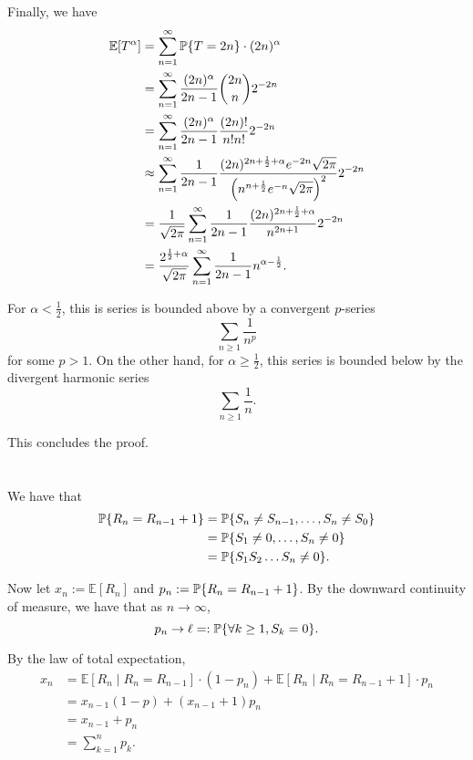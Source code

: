 \documentclass[10pt]{article}
\DeclarePairedDelimiter{\set}{\lbrace}{\rbrace}
\newcommand{\eq}[1]{\stackrel{#1}{=}}
\newcommand{\E}{\mathbb{E}}
\renewcommand{\P}{\mathbb{P}}
\begin{document}
Finally,
we have
\begin{align*}
  \E[T^\alpha]
  &= \sum_{n=1}^\infty \P\set{T=2n}\cdot (2n)^\alpha \\
  &= \sum_{n=1}^\infty \frac{(2n)^\alpha}{2n-1} \binom{2n}{n} 2^{-2n} \\
  &= \sum_{n=1}^\infty \frac{(2n)^\alpha}{2n-1} \frac{(2n)!}{n!n!} 2^{-2n} \\
  &\approx \sum_{n=1}^\infty \frac1{2n-1} \frac{(2n)^{2n+\frac12+\alpha} e^{-2n} \sqrt{2\pi}}{\left( n^{n+\frac12} e^{-n} \sqrt{2\pi} \right)^2} 2^{-2n} \\
  &= \frac1{\sqrt{2\pi}} \sum_{n=1}^\infty \frac1{2n-1} \frac{(2n)^{2n+\frac12+\alpha}}{n^{2n+1}} 2^{-2n} \\
  &= \frac{2^{\frac12+\alpha}}{\sqrt{2\pi}} \sum_{n=1}^\infty \frac1{2n-1} n^{\alpha-\frac12}.
\end{align*}

For $\alpha < \frac12$,
this is series is bounded above by a convergent $p$-series
\[
  \sum_{n\geq 1} \frac1{n^p}
\]
for some $p > 1$.
On the other hand,
for $\alpha \geq \frac12$,
this series is bounded below by the divergent harmonic series
\[
  \sum_{n\geq 1} \frac1n.
\]

This concludes the proof.

\clearpage
\section{}
We have that
\begin{align*}
  \P\set{R_{n} = R_{n-1} + 1}
  &= \P\set{S_n\neq S_{n-1}, \dots, S_n\neq S_0} \\
  &= \P\set{S_1\neq 0, \dots, S_n\neq 0} \\
  &= \P\set{S_1S_2\dots S_n\neq 0}.
\end{align*}
\iffalse
Note that here we used the fact
\[
  \sum_{i=1}^k X_i \eq{d} \sum_{i=1}^k X_{n-i+1}
\]
since the $X_i$'s are iid.
\fi

Now let $x_n := \E[R_n]$ and $p_n := \P\set{R_n = R_{n-1} + 1}$.
By the downward continuity of measure,
we have that as $n\to \infty$,
\[
  p_n\to \ell =: \P\set{\forall k\geq 1, S_k=0}.
\]

By the law of total expectation,
\begin{align*}
  x_n
  &= \E[R_n\mid R_n=R_{n-1}]\cdot (1-p_n) + \E[R_n\mid R_n=R_{n-1}+1]\cdot p_n \\
  &= x_{n-1} (1-p) + (x_{n-1} + 1) p_n \\
  &= x_{n-1} + p_n \\
  &= \sum_{k=1}^n p_k.
\end{align*}
\end{document}
